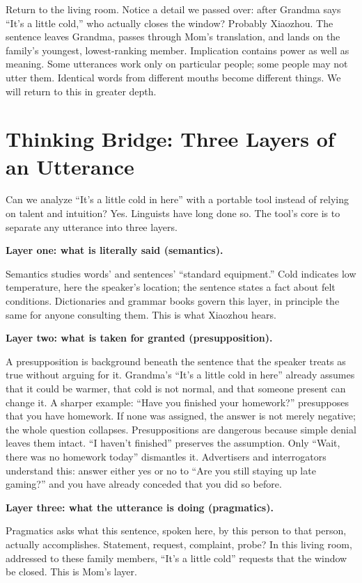 Return to the living room. Notice a detail we passed over: after Grandma says ``It's a little cold,'' who actually closes the window? Probably Xiaozhou. The sentence leaves Grandma, passes through Mom's translation, and lands on the family's youngest, lowest-ranking member. Implication contains power as well as meaning. Some utterances work only on particular people; some people may not utter them. Identical words from different mouths become different things. We will return to this in greater depth.

\section[Thinking Bridge: Layers of an Utterance]{Thinking Bridge: Three Layers of an Utterance}
Can we analyze ``It's a little cold in here'' with a portable tool instead of relying on talent and intuition? Yes. Linguists have long done so. The tool's core is to separate any utterance into three layers.

\textbf{Layer one: what is literally said (semantics).}

Semantics studies words' and sentences' ``standard equipment.'' Cold indicates low temperature, here the speaker's location; the sentence states a fact about felt conditions. Dictionaries and grammar books govern this layer, in principle the same for anyone consulting them. This is what Xiaozhou hears.

\textbf{Layer two: what is taken for granted (presupposition).}

A presupposition is background beneath the sentence that the speaker treats as true without arguing for it. Grandma's ``It's a little cold in here'' already assumes that it could be warmer, that cold is not normal, and that someone present can change it. A sharper example: ``Have you finished your homework?'' presupposes that you have homework. If none was assigned, the answer is not merely negative; the whole question collapses. Presuppositions are dangerous because simple denial leaves them intact. ``I haven't finished'' preserves the assumption. Only ``Wait, there was no homework today'' dismantles it. Advertisers and interrogators understand this: answer either yes or no to ``Are you still staying up late gaming?'' and you have already conceded that you did so before.

\textbf{Layer three: what the utterance is doing (pragmatics).}

Pragmatics asks what this sentence, spoken here, by this person to that person, actually accomplishes. Statement, request, complaint, probe? In this living room, addressed to these family members, ``It's a little cold'' requests that the window be closed. This is Mom's layer.

